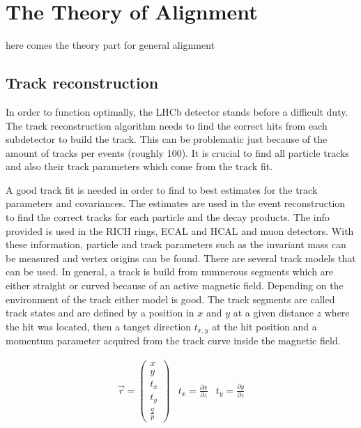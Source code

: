 \chapter{The Theory of Alignment}
\label{sec:alignTheory}

here comes the theory part for general alignment

\section{Track reconstruction}
\label{sec:kalman}

In order to function optimally, the LHCb detector stands before a difficult duty.
The track reconstruction algorithm needs to find the correct hits from each subdetector to build the track. This can be problematic just because of the amount of tracks per events (roughly 100).
It is crucial to find all particle tracks and also their track parameters which come from the track fit.

A good track fit is needed in order to find to best estimates for the track parameters and covariances. The estimates are used in the event reconstruction to find the correct tracks for each particle and the decay products. The info provided is used in the RICH rings, ECAL and HCAL and muon detectors. With these information, particle and track parameters such as the invariant mass can be measured and vertex origins can be found.
There are several track models that can be used. In general, a track is build from numnerous segments which are either straight or curved because of an active magnetic field. Depending on the environment of the track either model is good.
The track segments are called track states and are defined by a position in $x$ and $y$ at a given distance $z$ where the hit was located, then a tanget direction $t_{x,y}$ at the hit position and a momentum parameter acquired from the track curve inside the magnetic field.\cite{VanTilburg}

\begin{align}
  \vec{r} = \left(\begin{array}{c} x \\ y \\ t_x \\ t_y \\ \frac{q}{p}\end{array}\right) & t_x = \frac{\partial x}{\partial z} & t_y = \frac{\partial y}{\partial z}
\end{align}


